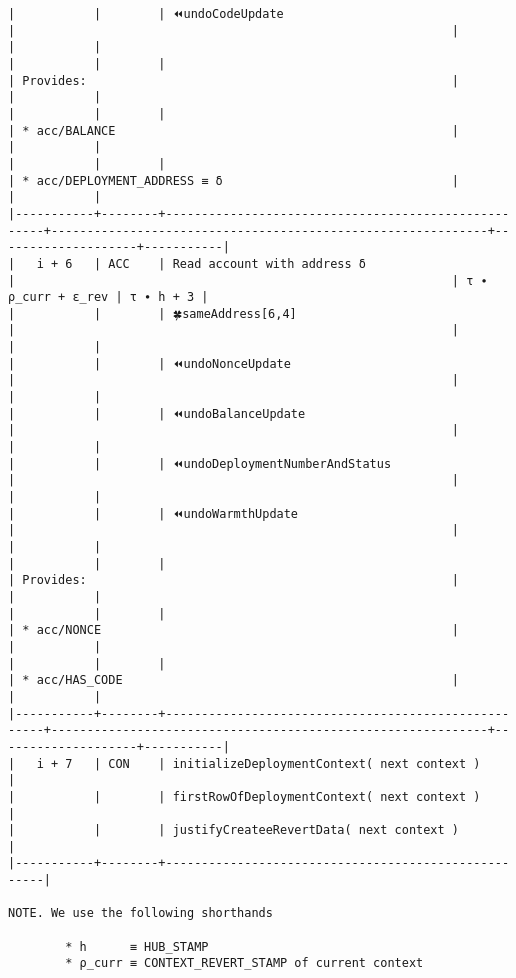 \documentclass[varwidth=\maxdimen,margin=0.5cm,multi={verbatim}]{standalone}
\begin{document}
\begin{verbatim}
|           |        | ⏪undoCodeUpdate                                    |                                                             |                    |           |
|           |        |                                                     | Provides:                                                   |                    |           |
|           |        |                                                     | * acc/BALANCE                                               |                    |           |
|           |        |                                                     | * acc/DEPLOYMENT_ADDRESS ≡ δ                                |                    |           |
|-----------+--------+-----------------------------------------------------+-------------------------------------------------------------+--------------------+-----------|
|   i + 6   | ACC    | Read account with address δ                         |                                                             | τ ∙ ρ_curr + ε_rev | τ ∙ h + 3 |
|           |        | 🍀sameAddress[6,4]                                  |                                                             |                    |           |
|           |        | ⏪undoNonceUpdate                                   |                                                             |                    |           |
|           |        | ⏪undoBalanceUpdate                                 |                                                             |                    |           |
|           |        | ⏪undoDeploymentNumberAndStatus                     |                                                             |                    |           |
|           |        | ⏪undoWarmthUpdate                                  |                                                             |                    |           |
|           |        |                                                     | Provides:                                                   |                    |           |
|           |        |                                                     | * acc/NONCE                                                 |                    |           |
|           |        |                                                     | * acc/HAS_CODE                                              |                    |           |
|-----------+--------+-----------------------------------------------------+-------------------------------------------------------------+--------------------+-----------|
|   i + 7   | CON    | initializeDeploymentContext( next context )         |
|           |        | firstRowOfDeploymentContext( next context )         |
|           |        | justifyCreateeRevertData( next context )            |
|-----------+--------+-----------------------------------------------------|

NOTE. We use the following shorthands

        * h      ≡ HUB_STAMP
        * ρ_curr ≡ CONTEXT_REVERT_STAMP of current context

\end{verbatim}
\end{document}
